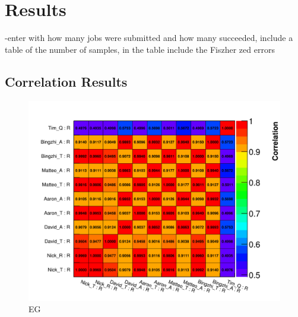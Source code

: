
\graphicspath{{Body/Figures/Correlations/}}

\section{Results}


-enter with how many jobs were submitted and how many succeeded, include a table of the number of samples, in the table include the Fiszher zed errors





\subsection{Correlation Results}




\begin{figure}[]
\centering
\includegraphics[width=\textwidth]{MethodType_CorrelationMatrixPlot_R_R_EG}
\caption{EG}
\label{fig:}
\end{figure}

